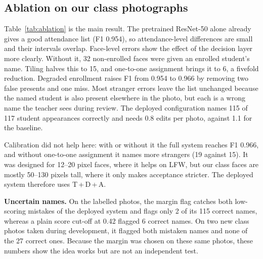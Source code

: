 \documentclass[conference,a4paper]{IEEEtran}
\begin{document}
\subsection{Ablation on our class photographs}
Table~\ref{tab:ablation} is the main result. The pretrained ResNet-50 alone already gives a good attendance list (F1 0.954), so attendance-level differences are small and their intervals overlap. Face-level errors show the effect of the decision layer more clearly. Without it, 32 non-enrolled faces were given an enrolled student's name. Tiling halves this to 15, and one-to-one assignment brings it to 6, a fivefold reduction. Degraded enrollment raises F1 from 0.954 to 0.966 by removing two false presents and one miss. Most stranger errors leave the list unchanged because the named student is also present elsewhere in the photo, but each is a wrong name the teacher sees during review. The deployed configuration names 115 of 117 student appearances correctly and needs 0.8 edits per photo, against 1.1 for the baseline.

Calibration did not help here: with or without it the full system reaches F1 0.966, and without one-to-one assignment it names more strangers (19 against 15). It was designed for 12--20 pixel faces, where it helps on LFW, but our class faces are mostly 50--130 pixels tall, where it only makes acceptance stricter. The deployed system therefore uses T\,+\,D\,+\,A.

\textbf{Uncertain names.} On the labelled photos, the margin flag catches both low-scoring mistakes of the deployed system and flags only 2 of its 115 correct names, whereas a plain score cut-off at 0.42 flagged 6 correct names. On two new class photos taken during development, it flagged both mistaken names and none of the 27 correct ones. Because the margin was chosen on these same photos, these numbers show the idea works but are not an independent test.
\end{document}

